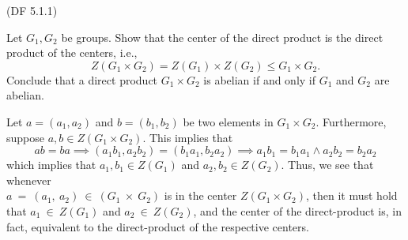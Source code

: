 \begin{problem}{(\textsf{DF 5.1.1})}

  \noindent
  Let $G_1,G_2$ be groups.
  Show that the center of the direct product is the direct product of the centers,
  i.e.,
  \[ Z(G_1 \times G_2) = Z(G_1) \times Z(G_2) \leq G_1 \times G_2. \]
  Conclude that a direct product $G_1 \times G_2$ is abelian
  if and only if $G_1$ and $G_2$ are abelian.
\end{problem}
\begin{Answer}
  Let $a = (a_1, a_2)$ and $b = (b_1, b_2)$ be two elements in $G_1 \times G_2$.
  Furthermore, suppose $a, b \in Z(G_1 \times G_2)$. This implies that
  \[
    ab = ba
    \implies (a_1 b_1, a_2 b_2) = (b_1 a_1, b_2 a_2) 
    \implies a_1 b_1 = b_1 a_1 \land a_2 b_2 = b_2 a_2
  \]
  which implies that $a_1, b_1 \in Z(G_1)$ and $a_2, b_2 \in Z(G_2)$.
  Thus, we see that whenever \\ $a~=~(a_1,~a_2)~\in~(G_1~\times~G_2)$
  is in the center $Z(G_1 \times G_2)$, then it must hold that
  $a_1~\in~Z(G_1)$ and $a_2~\in~Z(G_2)$,
  and the center of the direct-product is, in fact,
  equivalent to the direct-product of the respective centers.
\end{Answer}
